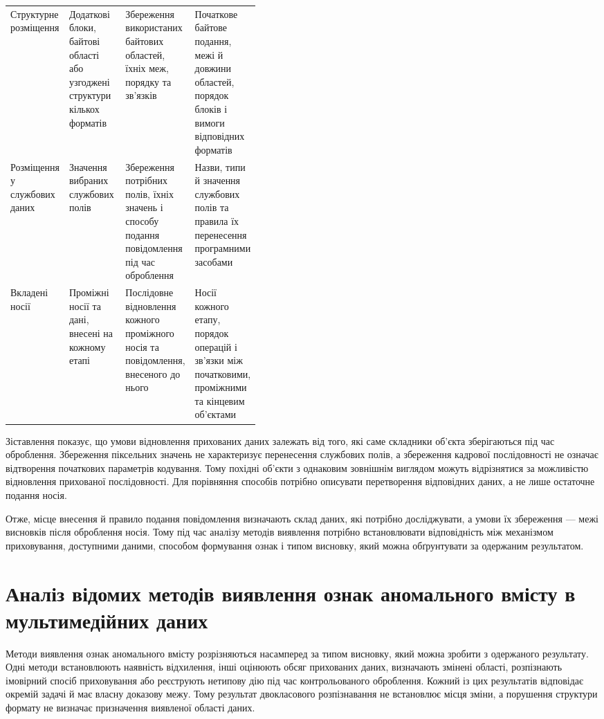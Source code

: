 \begin{landscape}
\begin{table}[H]
\begin{tabularx}{\linewidth}{>{\raggedright\arraybackslash}p{0.17\linewidth}>{\raggedright\arraybackslash}p{0.25\linewidth}YY}
Структурне розміщення & Додаткові блоки, байтові області або узгоджені структури кількох форматів & Збереження використаних байтових областей, їхніх меж, порядку та зв’язків & Початкове байтове подання, межі й довжини областей, порядок блоків і вимоги відповідних форматів \\
Розміщення у службових даних & Значення вибраних службових полів & Збереження потрібних полів, їхніх значень і способу подання повідомлення під час оброблення & Назви, типи й значення службових полів та правила їх перенесення програмними засобами \\
Вкладені носії & Проміжні носії та дані, внесені на кожному етапі & Послідовне відновлення кожного проміжного носія та повідомлення, внесеного до нього & Носії кожного етапу, порядок операцій і зв’язки між початковими, проміжними та кінцевим об’єктами \\
\bottomrule
\end{tabularx}
\endgroup
\end{table}
\end{landscape}

Зіставлення показує, що умови відновлення прихованих даних залежать від того, які саме складники об’єкта зберігаються під час оброблення. Збереження піксельних значень не характеризує перенесення службових полів, а збереження кадрової послідовності не означає відтворення початкових параметрів кодування. Тому похідні об’єкти з однаковим зовнішнім виглядом можуть відрізнятися за можливістю відновлення прихованої послідовності. Для порівняння способів потрібно описувати перетворення відповідних даних, а не лише остаточне подання носія.

Отже, місце внесення й правило подання повідомлення визначають склад даних, які потрібно досліджувати, а умови їх збереження --- межі висновків після оброблення носія. Тому під час аналізу методів виявлення потрібно встановлювати відповідність між механізмом приховування, доступними даними, способом формування ознак і типом висновку, який можна обґрунтувати за одержаним результатом.

\section{Аналіз відомих методів виявлення ознак аномального вмісту в мультимедійних даних}
\label{sec:detection_methods_analysis}

Методи виявлення ознак аномального вмісту розрізняються насамперед за типом висновку, який можна зробити з одержаного результату. Одні методи встановлюють наявність відхилення, інші оцінюють обсяг прихованих даних, визначають змінені області, розпізнають імовірний спосіб приховування або реєструють нетипову дію під час контрольованого оброблення. Кожний із цих результатів відповідає окремій задачі й має власну доказову межу. Тому результат двокласового розпізнавання не встановлює місця зміни, а порушення структури формату не визначає призначення виявленої області даних.

